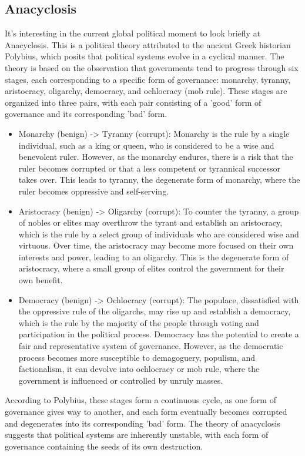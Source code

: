 \subsection{Anacyclosis}
It's interesting in the current global political moment to look briefly at Anacyclosis. This is a political theory attributed to the ancient Greek historian Polybius, which posits that political systems evolve in a cyclical manner. The theory is based on the observation that governments tend to progress through six stages, each corresponding to a specific form of governance: monarchy, tyranny, aristocracy, oligarchy, democracy, and ochlocracy (mob rule). These stages are organized into three pairs, with each pair consisting of a 'good' form of governance and its corresponding 'bad' form.\par
\begin{itemize}
\item Monarchy (benign) -> Tyranny (corrupt): Monarchy is the rule by a single individual, such as a king or queen, who is considered to be a wise and benevolent ruler. However, as the monarchy endures, there is a risk that the ruler becomes corrupted or that a less competent or tyrannical successor takes over. This leads to tyranny, the degenerate form of monarchy, where the ruler becomes oppressive and self-serving.
\item Aristocracy (benign) -> Oligarchy (corrupt): To counter the tyranny, a group of nobles or elites may overthrow the tyrant and establish an aristocracy, which is the rule by a select group of individuals who are considered wise and virtuous. Over time, the aristocracy may become more focused on their own interests and power, leading to an oligarchy. This is the degenerate form of aristocracy, where a small group of elites control the government for their own benefit.
\item Democracy (benign) -> Ochlocracy (corrupt): The populace, dissatisfied with the oppressive rule of the oligarchs, may rise up and establish a democracy, which is the rule by the majority of the people through voting and participation in the political process. Democracy has the potential to create a fair and representative system of governance. However, as the democratic process becomes more susceptible to demagoguery, populism, and factionalism, it can devolve into ochlocracy or mob rule, where the government is influenced or controlled by unruly masses.
\end{itemize}
According to Polybius, these stages form a continuous cycle, as one form of governance gives way to another, and each form eventually becomes corrupted and degenerates into its corresponding 'bad' form. The theory of anacyclosis suggests that political systems are inherently unstable, with each form of governance containing the seeds of its own destruction. 

